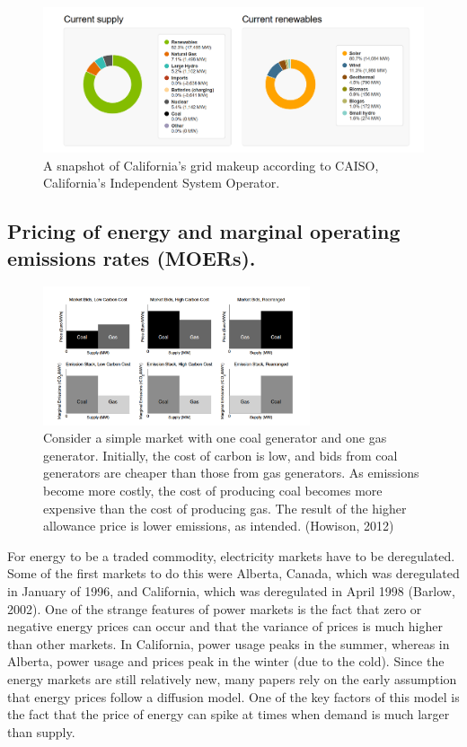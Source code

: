 \documentclass{article}
\begin{document}
\begin{figure}[h]
    \centering
    \includegraphics[width=\textwidth]{renewables.png}
    \caption{A snapshot of California's grid makeup according to CAISO, California's Independent System Operator.}
    \label{fig:grid4}
\end{figure}

\subsection{Pricing of energy and marginal operating emissions rates (MOERs).}

\begin{figure}[h]
    \centering
    \includegraphics[width=0.7\textwidth]{prices.png}
    \caption{Consider a simple market with one coal generator and one gas generator. Initially, 
    the cost of carbon is low, and bids from coal generators are cheaper than those from gas generators. 
    As emissions become more costly, the cost of producing coal becomes more expensive than the cost of producing gas. 
    The result of the higher allowance price is lower emissions, as intended. (Howison, 2012)}
    \label{fig:grid4}
\end{figure}

For energy to be a traded commodity, electricity markets have to be deregulated. Some of the first markets to do
this were Alberta, Canada, which was deregulated in January of 1996, and California, which was deregulated in April 1998 (Barlow, 2002).
One of the strange features of power markets is the fact that zero or negative energy prices can occur and that the variance
of prices is much higher than other markets. In California, power usage peaks in the summer, whereas in Alberta, power usage and prices peak in the
winter (due to the cold). Since the energy markets are still relatively new, many papers rely on the early assumption that energy prices
follow a diffusion model. One of the key factors of this model is the fact that the price of energy can spike at times when demand is much larger than
supply. 
\end{document}
